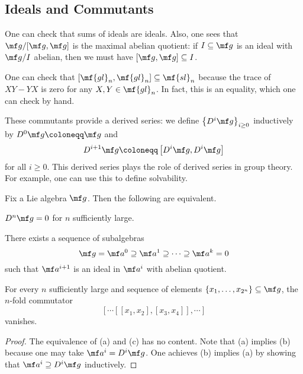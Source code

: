 \documentclass[../notes.tex]{subfiles}
\begin{document}
\subsection{Ideals and Commutants}
One can check that sums of ideals are ideals. Also, one sees that $\mf g/[\mf g,\mf g]$ is the maximal abelian quotient: if $I\subseteq\mf g$ is an ideal with $\mf g/I$ abelian, then we must have $[\mf g,\mf g]\subseteq I$.
\begin{example}
	One can check that $[\mf{gl}_n,\mf{gl}_n]\subseteq\mf{sl}_n$ because the trace of $XY-YX$ is zero for any $X,Y\in\mf{gl}_n$. In fact, this is an equality, which one can check by hand.
\end{example}
These commutants provide a derived series: we define $\left\{D^i\mf g\right\}_{i\ge0}$ inductively by $D^0\mf g\coloneqq\mf g$ and
\[D^{i+1}\mf g\coloneqq\left[D^i\mf g,D^i\mf g\right]\]
for all $i\ge0$. This derived series plays the role of derived series in group theory. For example, one can use this to define solvability.
\begin{proposition}
	Fix a Lie algebra $\mf g$. Then the following are equivalent.
	\begin{listalph}
		\item $D^n\mf g=0$ for $n$ sufficiently large.
		\item There exists a sequence of subalgebras
		\[\mf g=\mf a^0\supseteq\mf a^1\supseteq\cdots\supseteq\mf a^k=0\]
		such that $\mf a^{i+1}$ is an ideal in $\mf a^i$ with abelian quotient.
		\item For every $n$ sufficiently large and sequence of elements $\{x_1,\ldots,x_{2^n}\}\subseteq\mf g$, the $n$-fold commutator
		\[[\cdots[[x_1,x_2],[x_3,x_4]],\cdots]\]
		vanishes.
	\end{listalph}
\end{proposition}
\begin{proof}
	The equivalence of (a) and (c) has no content. Note that (a) implies (b) because one may take $\mf a^i=D^i\mf g$. One achieves (b) implies (a) by showing that $\mf a^i\supseteq D^i\mf g$ inductively.
\end{proof}
\end{document}
